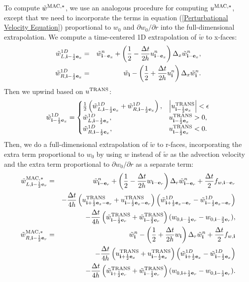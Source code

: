 \documentclass[11pt]{article}
\def\half  {\frac{1}{2}}
\def\dt    {\Delta t}
\def\mac   {\rm MAC}
\def\trans {\rm TRANS}
\def\eb    {{\bf e}}
\def\ib    {{\bf i}}
\def\wt    {\tilde{w}}
\begin{document}
To compute $\wt^{\mac,*}$, we use an analogous procedure for computing $u^{\mac,*}$, except that we need to incorporate the terms in equation (\ref{Perturbational Velocity Equation}) proportional to $w_0$ and $\partial w_0/\partial r$ into the full-dimensional extrapolation.  We compute a time-centered 1D extrapolation of $\wt$ to x-faces:
\begin{eqnarray}
\wt_{L,\ib-\half\eb_x}^{1D} &=& \wt_{\ib-\eb_x}^n + \left(\half - \frac{\dt}{2h}u_{\ib-\eb_x}^n\right)\Delta_x \wt_{\ib-\eb_x}^n, \\
\wt_{R,\ib-\half\eb_x}^{1D} &=& \wt_{\ib} - \left(\half + \frac{\dt}{2h}u_{\ib}^n\right)\Delta_x \wt_{\ib}^n.
\end{eqnarray}
Then we upwind based on $u^{\trans}$:
\begin{equation}
\wt_{\ib-\half\eb_x}^{1D} =
\begin{cases}
\half\left(\wt_{L,\ib-\half\eb_x}^{1D} + \wt_{R,\ib-\half\eb_x}^{1D}\right), & \left|u^{\trans}_{\ib-\half\eb_x}\right| < \epsilon \\
\wt_{L,\ib-\half\eb_x}^{1D}, & u^{\trans}_{\ib-\half\eb_x} > 0, \\
\wt_{R,\ib-\half\eb_x}^{1D}, & u^{\trans}_{\ib-\half\eb_x} < 0. \\
\end{cases}
\end{equation}
Then, we do a full-dimensional extrapolation of $\wt$ to r-faces, incorporating the extra term proportional to $w_0$ by using $w$ instead of $\wt$ as the advection velocity and the extra term proportional to $\partial w_0/\partial r$ as a separate term:
\begin{eqnarray}
\wt_{L,\ib-\half\eb_r}^{\mac,*} &=& \wt_{\ib-\eb_r}^n + \left(\half - \frac{\dt}{2h}w_{\ib-\eb_r}\right)\Delta_r \wt_{\ib-\eb_r}^n + \frac{\dt}{2}f_{w,\ib-\eb_r} \nonumber \\
&& - \frac{\dt}{4h}\left(u_{\ib+\half\eb_x-\eb_r}^{\trans}+u_{\ib-\half\eb_x-\eb_r}^{\trans}\right)\left(\wt_{\ib+\half\eb_x-\eb_r}^{1D} - \wt_{\ib-\half\eb_x-\eb_r}^{1D}\right) \nonumber \\
&& - \frac{\dt}{4h}\left(\wt_{\ib-\half\eb_r}^{\trans}+\wt_{\ib-\frac{3}{2}\eb_r}^{\trans}\right)(w_{0,\ib-\half\eb_r} - w_{0,\ib-\frac{3}{2}\eb_r}),\label{wt_L Extrapolation} \\
\wt_{R,\ib-\half\eb_r}^{\mac,*} &=& \wt_{\ib}^n - \left(\half + \frac{\dt}{2h}w_{\ib}\right)\Delta_r \wt_{\ib}^n + \frac{\dt}{2}f_{w,\ib} \nonumber \\
&& - \frac{\dt}{4h}\left(u_{\ib+\half\eb_x}^{\trans}+u_{\ib-\half\eb_x}^{\trans}\right)\left(\wt_{\ib+\half\eb_x}^{1D} - \wt_{\ib-\half\eb_x}^{1D}\right) \nonumber \\
&& - \frac{\dt}{4h}\left(\wt_{\ib+\half\eb_r}^{\trans}+\wt_{\ib-\half\eb_r}^{\trans}\right)(w_{0,\ib+\half\eb_r} - w_{0,\ib-\half\eb_r}).\label{wt_R Extrapolation}
\end{eqnarray}
\end{document}
